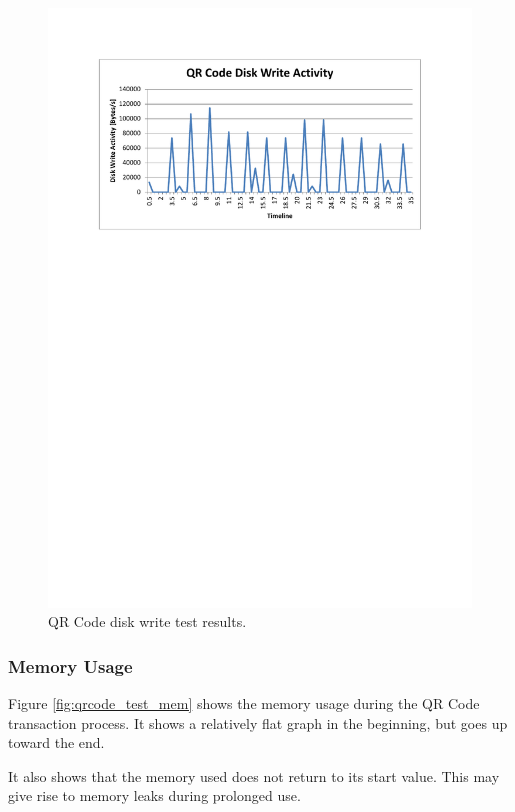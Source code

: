 \begin{figure}
 \centering 
 \includegraphics[clip=true, trim = 0 530 0 70,
 scale=0.7]{qrcode_test_disk}
 \caption{QR Code disk write test results.}
 \label{fig:qrcode_test_disk}
\end{figure}

\subsubsection{Memory Usage}

Figure \ref{fig:qrcode_test_mem} shows the memory usage during the QR Code transaction
process. It shows a relatively flat graph in the beginning, but goes up toward the end. 

It also shows that the memory used does not return to its start value. This may give rise
to memory leaks during prolonged use. 

